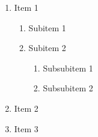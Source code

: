 \documentclass{article}
\begin{document}
\begin{enumerate}
    \item Item 1
    \begin{enumerate}
        \item Subitem 1
        \item Subitem 2
        \begin{enumerate}
            \item Subsubitem 1
            \item Subsubitem 2
        \end{enumerate}
    \end{enumerate}
    \item Item 2
    \item Item 3
\end{enumerate}

\end{document}
